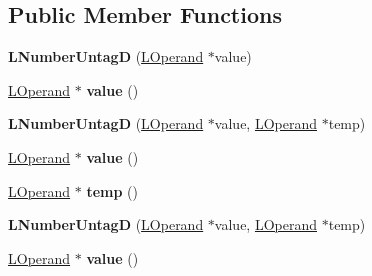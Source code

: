 \subsection*{Public Member Functions}
\begin{DoxyCompactItemize}
\item 
{\bfseries L\+Number\+UntagD} (\hyperlink{classv8_1_1internal_1_1_l_operand}{L\+Operand} $\ast$value)\hypertarget{classv8_1_1internal_1_1_l_number_untag_d_a6195991638df30aa05bd5f56d1797122}{}\label{classv8_1_1internal_1_1_l_number_untag_d_a6195991638df30aa05bd5f56d1797122}

\item 
\hyperlink{classv8_1_1internal_1_1_l_operand}{L\+Operand} $\ast$ {\bfseries value} ()\hypertarget{classv8_1_1internal_1_1_l_number_untag_d_a5d9709578f231f68349450294600f9bb}{}\label{classv8_1_1internal_1_1_l_number_untag_d_a5d9709578f231f68349450294600f9bb}

\item 
{\bfseries L\+Number\+UntagD} (\hyperlink{classv8_1_1internal_1_1_l_operand}{L\+Operand} $\ast$value, \hyperlink{classv8_1_1internal_1_1_l_operand}{L\+Operand} $\ast$temp)\hypertarget{classv8_1_1internal_1_1_l_number_untag_d_ad7c6d9f3e2c74bf549446fbe073e2ca9}{}\label{classv8_1_1internal_1_1_l_number_untag_d_ad7c6d9f3e2c74bf549446fbe073e2ca9}

\item 
\hyperlink{classv8_1_1internal_1_1_l_operand}{L\+Operand} $\ast$ {\bfseries value} ()\hypertarget{classv8_1_1internal_1_1_l_number_untag_d_a5d9709578f231f68349450294600f9bb}{}\label{classv8_1_1internal_1_1_l_number_untag_d_a5d9709578f231f68349450294600f9bb}

\item 
\hyperlink{classv8_1_1internal_1_1_l_operand}{L\+Operand} $\ast$ {\bfseries temp} ()\hypertarget{classv8_1_1internal_1_1_l_number_untag_d_aae6f1f1228c5ed10297dd029b1646c74}{}\label{classv8_1_1internal_1_1_l_number_untag_d_aae6f1f1228c5ed10297dd029b1646c74}

\item 
{\bfseries L\+Number\+UntagD} (\hyperlink{classv8_1_1internal_1_1_l_operand}{L\+Operand} $\ast$value, \hyperlink{classv8_1_1internal_1_1_l_operand}{L\+Operand} $\ast$temp)\hypertarget{classv8_1_1internal_1_1_l_number_untag_d_ad7c6d9f3e2c74bf549446fbe073e2ca9}{}\label{classv8_1_1internal_1_1_l_number_untag_d_ad7c6d9f3e2c74bf549446fbe073e2ca9}

\item 
\hyperlink{classv8_1_1internal_1_1_l_operand}{L\+Operand} $\ast$ {\bfseries value} ()\hypertarget{classv8_1_1internal_1_1_l_number_untag_d_a5d9709578f231f68349450294600f9bb}{}\label{classv8_1_1internal_1_1_l_number_untag_d_a5d9709578f231f68349450294600f9bb}


\end{DoxyCompactItemize}
